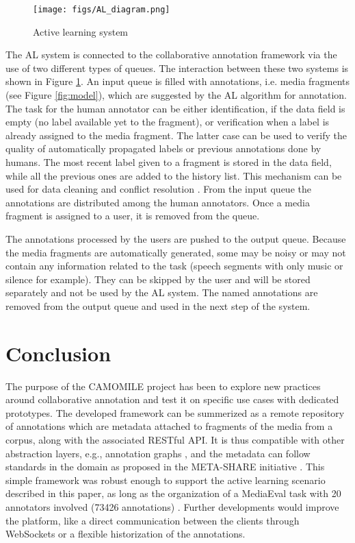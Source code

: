 \documentclass[10pt, a4paper]{article}
\begin{document}
\begin{figure}[htb]
 \center 
 \texttt{[image: figs/AL\_diagram.png]}
 \centering
 \caption {Active learning system}
 \label{fig:ALdiagram}
\end{figure}


The AL system is connected to the collaborative annotation framework via the use of two different types of queues. The interaction between these two systems is shown in Figure \ref{fig:ALdiagram}. An input queue is filled with annotations, i.e. media fragments (see Figure \ref{fig:model}), which are suggested by the AL algorithm for annotation. The task for the human annotator can be either identification, if the data field is empty (no label available yet to the fragment), or verification when a label is already assigned to the media fragment. The latter case can be used to verify the quality of automatically propagated labels or previous annotations done by humans. The most recent label given to a fragment is stored in the data field, while all the previous ones are added to the history list. This mechanism can be used for data cleaning and conflict resolution \cite{Safadi2012}. From the input queue the annotations are distributed among the human annotators. Once a media fragment is assigned to a user, it is removed from the queue. 

The annotations processed by the users are pushed to the output queue. Because the media fragments are automatically generated, some may be noisy or may not contain any information related to the task (speech segments with only music or silence for example). They can be skipped by the user and will be stored separately and not be used by the AL system. The named annotations are removed from the output queue and used in the next step of the system.


\section{Conclusion}

The purpose of the CAMOMILE project has been to explore new practices around collaborative annotation and test it on specific use cases with dedicated prototypes. The developed framework can be summerized as a remote repository of annotations which are metadata attached to fragments of the media from a corpus, along with the associated RESTful API. It is thus compatible with other abstraction layers, e.g., annotation graphs \cite{Bird2001}, and the metadata can follow standards in the domain as proposed in the META-SHARE initiative \cite{META-SHARE}. This simple framework was robust enough to support the active learning scenario described in this paper, as long as the organization of a MediaEval task with 20 annotators involved (73426 annotations) \cite{Poignant2016} . Further developments would improve the platform, like a direct communication between the clients through WebSockets or a flexible historization of the annotations.
\end{document}
